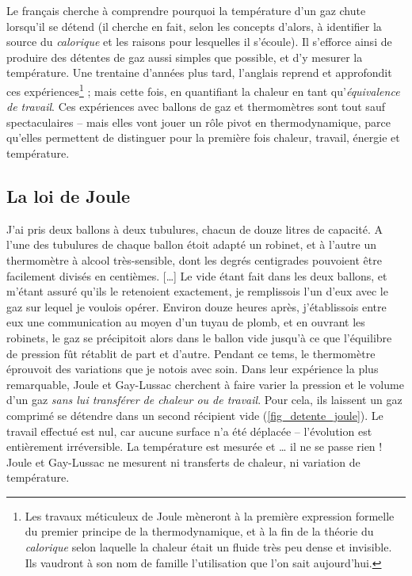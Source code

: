 		Le français  cherche à comprendre pourquoi la température d’un gaz chute lorsqu’il se détend (il cherche en fait, selon les concepts d’alors, à identifier la source du \textit{calorique} et les raisons pour lesquelles il s’écoule). Il s’efforce ainsi de produire des détentes de gaz aussi simples que possible, et d’y mesurer la température. Une trentaine d’années plus tard, l’anglais  reprend et approfondit ces expériences\footnote{Les travaux méticuleux de Joule mèneront à la première expression formelle du premier principe de la thermodynamique, et à la fin de la théorie du \textit{calorique} selon laquelle la chaleur était un fluide très peu dense et invisible. Ils vaudront à son nom de famille l’utilisation que l’on sait aujourd’hui.} ; mais cette fois, en quantifiant la chaleur en tant qu’\textit{équivalence de travail}. Ces expériences avec ballons de gaz et thermomètres sont tout sauf spectaculaires -- mais elles vont jouer un rôle pivot en thermodynamique, parce qu’elles permettent de distinguer pour la première fois chaleur, travail, énergie et température.

	\subsection{La loi de Joule}
	\label{ch_principe_de_joule}

			J’ai pris deux ballons à deux tubulures, chacun de douze litres de capacité. A l’une des tubulures de chaque ballon étoit adapté un robinet, et à l’autre un thermomètre à alcool très-sensible, dont les degrés centigrades pouvoient être facilement divisés en centièmes. […] Le vide étant fait dans les deux ballons, et m’étant assuré qu’ils le retenoient exactement, je remplissois l’un d’eux avec le gaz sur lequel je voulois opérer. Environ douze heures après, j’établissois entre eux une communication au moyen d’un tuyau de plomb, et en ouvrant les robinets, le gaz se précipitoit alors dans le ballon vide jusqu’à ce que l’équilibre de pression fût rétablit de part et d’autre. Pendant ce tems, le thermomètre éprouvoit des variations que je notois avec soin.
		Dans leur expérience la plus remarquable, Joule et Gay-Lussac cherchent à faire varier la pression et le volume d’un gaz \textit{sans lui transférer de chaleur ou de travail}. Pour cela, ils laissent un gaz comprimé se détendre dans un second récipient vide (\cref{fig_detente_joule}). Le travail effectué est nul, car aucune surface n’a été déplacée – l’évolution est entièrement irréversible. La température est mesurée et … il ne se passe rien ! Joule et Gay-Lussac ne mesurent ni transferts de chaleur, ni variation de température.


